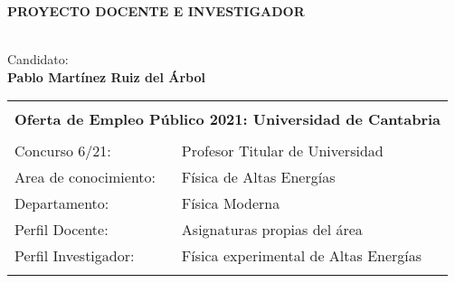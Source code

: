 \thispagestyle{empty}
\newpage
\begin{center}
\baselineskip=1cm {\centerline \bf \huge
\textbf{PROYECTO DOCENTE E INVESTIGADOR}} \vspace*{2.5cm}\\

\vspace*{2.0cm} \baselineskip=0.5cm
{\Large Candidato:}\\
\vspace*{0.25cm}
{\Large \bf \sc \textbf{Pablo Martínez Ruiz del Árbol}}\\
\vspace*{0.15cm}
\vspace*{2.0cm} \baselineskip=0.75cm
\end{center}


\begin{center}
\begin{tabularx}{\textwidth}{||X X||}
\hline\hline
\multicolumn{2}{||c||}{} \\
\multicolumn{2}{||c||}{\large \textbf{Oferta de Empleo Público 2021: Universidad de Cantabria}} \\
& \\
Concurso 6/21: & Profesor Titular de Universidad \\
Area de conocimiento: & {Física de Altas Energías} \\
Departamento: & {Física Moderna} \\
Perfil Docente: & {Asignaturas propias del área} \\ 
Perfil Investigador: & {Física experimental de Altas Energías} \\
& \\
\hline\hline
\end{tabularx}
\end{center}

\normalsize
